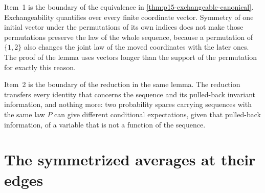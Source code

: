 Item~1 is the boundary of the equivalence in
\cref{thm:p15-exchangeable-canonical}. Exchangeability quantifies over
every finite coordinate vector. Symmetry of one initial vector under the
permutations of its own indices does not make those permutations
preserve the law of the whole sequence, because a permutation of
\(\{1,2\}\) also changes the joint law of the moved coordinates with the
later ones. The proof of the lemma uses vectors longer than the support
of the permutation for exactly this reason.

Item~2 is the boundary of the reduction in the same lemma. The reduction
transfers every identity that concerns the sequence and its pulled-back
invariant information, and nothing more: two probability spaces carrying
sequences with the same law \(P\) can give different conditional
expectations, given that pulled-back information, of a variable that is
not a function of the sequence.

\section{The symmetrized averages at their edges}
\label{sec:p15-w02c-p15-022-averages}

